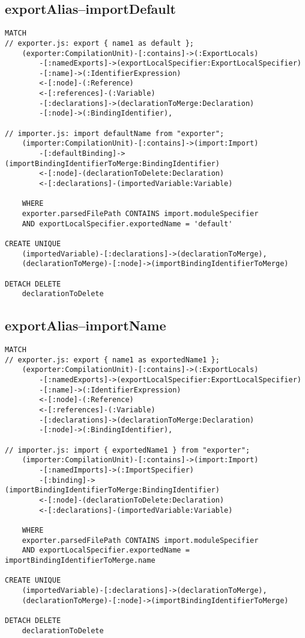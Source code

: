 \subsection{exportAlias–importDefault}
\begin{lstlisting}[language=Cypher]
MATCH
// exporter.js: export { name1 as default };
    (exporter:CompilationUnit)-[:contains]->(:ExportLocals)
        -[:namedExports]->(exportLocalSpecifier:ExportLocalSpecifier)
        -[:name]->(:IdentifierExpression)
        <-[:node]-(:Reference)
        <-[:references]-(:Variable)
        -[:declarations]->(declarationToMerge:Declaration)
        -[:node]->(:BindingIdentifier),

// importer.js: import defaultName from "exporter";
    (importer:CompilationUnit)-[:contains]->(import:Import)
        -[:defaultBinding]->(importBindingIdentifierToMerge:BindingIdentifier)
        <-[:node]-(declarationToDelete:Declaration)
        <-[:declarations]-(importedVariable:Variable)

    WHERE
    exporter.parsedFilePath CONTAINS import.moduleSpecifier
    AND exportLocalSpecifier.exportedName = 'default'

CREATE UNIQUE
    (importedVariable)-[:declarations]->(declarationToMerge),
    (declarationToMerge)-[:node]->(importBindingIdentifierToMerge)

DETACH DELETE
    declarationToDelete
\end{lstlisting}

\newpage
\subsection{exportAlias–importName}
\begin{lstlisting}[language=Cypher]
MATCH
// exporter.js: export { name1 as exportedName1 };
    (exporter:CompilationUnit)-[:contains]->(:ExportLocals)
        -[:namedExports]->(exportLocalSpecifier:ExportLocalSpecifier)
        -[:name]->(:IdentifierExpression)
        <-[:node]-(:Reference)
        <-[:references]-(:Variable)
        -[:declarations]->(declarationToMerge:Declaration)
        -[:node]->(:BindingIdentifier),

// importer.js: import { exportedName1 } from "exporter";
    (importer:CompilationUnit)-[:contains]->(import:Import)
        -[:namedImports]->(:ImportSpecifier)
        -[:binding]->(importBindingIdentifierToMerge:BindingIdentifier)
        <-[:node]-(declarationToDelete:Declaration)
        <-[:declarations]-(importedVariable:Variable)

    WHERE
    exporter.parsedFilePath CONTAINS import.moduleSpecifier
    AND exportLocalSpecifier.exportedName = importBindingIdentifierToMerge.name

CREATE UNIQUE
    (importedVariable)-[:declarations]->(declarationToMerge),
    (declarationToMerge)-[:node]->(importBindingIdentifierToMerge)

DETACH DELETE
    declarationToDelete
\end{lstlisting}

